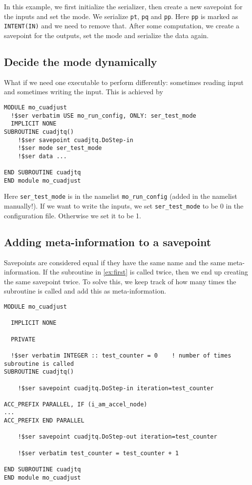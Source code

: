 \documentclass{article}
\begin{document}
In this example, we first initialize the serializer, then create a new savepoint for the inputs and set the mode. We serialize \texttt{pt}, \texttt{pq} and \texttt{pp}. Here \texttt{pp} is marked as \texttt{INTENT(IN)} and we need to remove that. After some computation, we create a savepoint for the outputs, set the mode and serialize the data again.

\subsection{Decide the mode dynamically}
\label{ex:mode}
What if we need one executable to perform differently: sometimes reading input and sometimes writing the input. This is achieved by
\begin{lstlisting}
MODULE mo_cuadjust
  !$ser verbatim USE mo_run_config, ONLY: ser_test_mode
  IMPLICIT NONE
SUBROUTINE cuadjtq()
    !$ser savepoint cuadjtq.DoStep-in
    !$ser mode ser_test_mode
    !$ser data ...

END SUBROUTINE cuadjtq
END module mo_cuadjust
\end{lstlisting}

Here \texttt{ser\_test\_mode} is in the namelist \texttt{mo\_run\_config} (added in the namelist manually!). If we want to write the inputs, we set \texttt{ser\_test\_mode} to be 0 in the configuration file. Otherwise we set it to be 1.

\subsection{Adding meta-information to a savepoint}
\label{ex:metainfo}
Savepoints are considered equal if they have the same name and the same meta-information. If the subroutine in \ref{ex:first} is called twice, then we end up creating the same savepoint twice. To solve this, we keep track of how many times the subroutine is called and add this as meta-information.

\begin{lstlisting}
MODULE mo_cuadjust

  IMPLICIT NONE

  PRIVATE

  !$ser verbatim INTEGER :: test_counter = 0    ! number of times subroutine is called
SUBROUTINE cuadjtq()

    !$ser savepoint cuadjtq.DoStep-in iteration=test_counter

ACC_PREFIX PARALLEL, IF (i_am_accel_node)
...
ACC_PREFIX END PARALLEL

    !$ser savepoint cuadjtq.DoStep-out iteration=test_counter

    !$ser verbatim test_counter = test_counter + 1

END SUBROUTINE cuadjtq
END module mo_cuadjust
\end{lstlisting}
\end{document}
